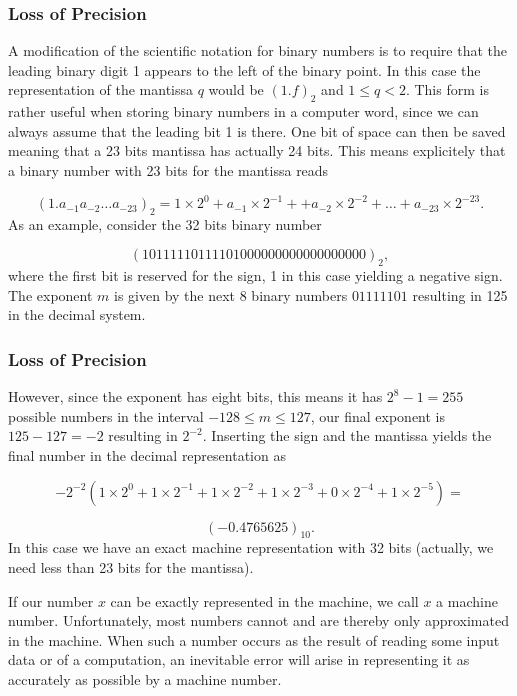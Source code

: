 \documentclass[handout]{beamer}
\newenvironment{block_mdfboxadmon}[1][]{\begin{block}{#1}}{\end{block}}
\begin{document}
\begin{frame}
\frametitle{Loss of Precision}

\begin{block_mdfboxadmon}
A modification of the scientific notation for binary numbers is to
require that the leading binary digit 1 appears to the left of the binary point.
In this case the representation of the mantissa $q$ would be
$(1.f)_2$ and $ 1 \le q < 2$. This form is rather useful when storing
binary numbers in a computer word, since we can always assume that the leading
bit 1 is there. One bit of space can then be saved meaning that a 23 bits
mantissa has actually 24 bits. This means explicitely that a binary number with 23 bits
for the mantissa reads

\begin{equation}
(1.a_{-1}a_{-2}\dots a_{-23})_2=1\times 2^0+a_{-1}\times 2^{-1}+
+a_{-2}\times 2^{-2}+\dots+a_{-23}\times 2^{-23}.
\end{equation}
As an example, consider the 32 bits binary number

\[
(10111110111101000000000000000000)_2,
\]
where the first bit is reserved for the sign, 1 in this case yielding a
negative sign. The exponent $m$ is given by the next 8 binary numbers
$01111101$ resulting in 125 in the decimal system.
\end{block_mdfboxadmon}
\end{frame}

\begin{frame}
\frametitle{Loss of Precision}

\begin{block_mdfboxadmon}
However, since the
exponent has eight bits, this means it has  $2^8-1=255$ possible numbers in the interval
$-128 \le m \le 127$, our final
exponent is $125-127=-2$ resulting in $2^{-2}$.
Inserting the sign and the mantissa yields the final number in the decimal representation as

\[
 -2^{-2}\left(1\times 2^0+1\times 2^{-1}+
1\times 2^{-2}+1\times 2^{-3}+0\times 2^{-4}+1\times 2^{-5}\right)=\]

\[
(-0.4765625)_{10}.
\]
In this case we have an exact machine representation with 32 bits (actually, we need less than
23 bits for the mantissa).

If our number $x$ can be exactly represented in the machine, we call
$x$ a machine number. Unfortunately, most numbers cannot  and are thereby
only approximated in the machine. When such a number occurs as the result
of reading some input data or of a computation, an inevitable error
will arise in representing it as accurately as possible by
a machine number.
\end{block_mdfboxadmon}
\end{frame}
\end{document}
